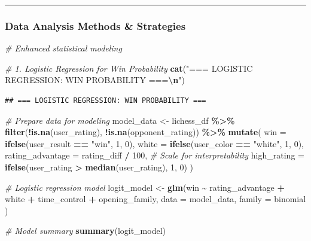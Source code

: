 \documentclass[
]{article}
\newenvironment{Shaded}{\begin{snugshade}}{\end{snugshade}}
\newcommand{\AttributeTok}[1]{\textcolor[rgb]{0.13,0.29,0.53}{#1}}
\newcommand{\CommentTok}[1]{\textcolor[rgb]{0.56,0.35,0.01}{\textit{#1}}}
\newcommand{\DecValTok}[1]{\textcolor[rgb]{0.00,0.00,0.81}{#1}}
\newcommand{\FunctionTok}[1]{\textcolor[rgb]{0.13,0.29,0.53}{\textbf{#1}}}
\newcommand{\NormalTok}[1]{#1}
\newcommand{\OtherTok}[1]{\textcolor[rgb]{0.56,0.35,0.01}{#1}}
\newcommand{\SpecialCharTok}[1]{\textcolor[rgb]{0.81,0.36,0.00}{\textbf{#1}}}
\newcommand{\StringTok}[1]{\textcolor[rgb]{0.31,0.60,0.02}{#1}}
\begin{document}
\begin{center}\rule{0.5\linewidth}{0.5pt}\end{center}

\subsubsection{Data Analysis Methods \&
Strategies}\label{data-analysis-methods-strategies}

\begin{Shaded}
\begin{Highlighting}[]
\CommentTok{\# Enhanced statistical modeling}

\CommentTok{\# 1. Logistic Regression for Win Probability}
\FunctionTok{cat}\NormalTok{(}\StringTok{"=== LOGISTIC REGRESSION: WIN PROBABILITY ===}\SpecialCharTok{\textbackslash{}n}\StringTok{"}\NormalTok{)}
\end{Highlighting}
\end{Shaded}

\begin{verbatim}
## === LOGISTIC REGRESSION: WIN PROBABILITY ===
\end{verbatim}

\begin{Shaded}
\begin{Highlighting}[]
\CommentTok{\# Prepare data for modeling}
\NormalTok{model\_data }\OtherTok{\textless{}{-}}\NormalTok{ lichess\_df }\SpecialCharTok{\%\textgreater{}\%}
  \FunctionTok{filter}\NormalTok{(}\SpecialCharTok{!}\FunctionTok{is.na}\NormalTok{(user\_rating), }\SpecialCharTok{!}\FunctionTok{is.na}\NormalTok{(opponent\_rating)) }\SpecialCharTok{\%\textgreater{}\%}
  \FunctionTok{mutate}\NormalTok{(}
    \AttributeTok{win =} \FunctionTok{ifelse}\NormalTok{(user\_result }\SpecialCharTok{==} \StringTok{"win"}\NormalTok{, }\DecValTok{1}\NormalTok{, }\DecValTok{0}\NormalTok{),}
    \AttributeTok{white =} \FunctionTok{ifelse}\NormalTok{(user\_color }\SpecialCharTok{==} \StringTok{"white"}\NormalTok{, }\DecValTok{1}\NormalTok{, }\DecValTok{0}\NormalTok{),}
    \AttributeTok{rating\_advantage =}\NormalTok{ rating\_diff }\SpecialCharTok{/} \DecValTok{100}\NormalTok{, }\CommentTok{\# Scale for interpretability}
    \AttributeTok{high\_rating =} \FunctionTok{ifelse}\NormalTok{(user\_rating }\SpecialCharTok{\textgreater{}} \FunctionTok{median}\NormalTok{(user\_rating), }\DecValTok{1}\NormalTok{, }\DecValTok{0}\NormalTok{)}
\NormalTok{  )}

\CommentTok{\# Logistic regression model}
\NormalTok{logit\_model }\OtherTok{\textless{}{-}} \FunctionTok{glm}\NormalTok{(win }\SpecialCharTok{\textasciitilde{}}\NormalTok{ rating\_advantage }\SpecialCharTok{+}\NormalTok{ white }\SpecialCharTok{+}\NormalTok{ time\_control }\SpecialCharTok{+}\NormalTok{ opening\_family,}
  \AttributeTok{data =}\NormalTok{ model\_data, }\AttributeTok{family =}\NormalTok{ binomial}
\NormalTok{)}

\CommentTok{\# Model summary}
\FunctionTok{summary}\NormalTok{(logit\_model)}
\end{Highlighting}
\end{Shaded}
\end{document}
